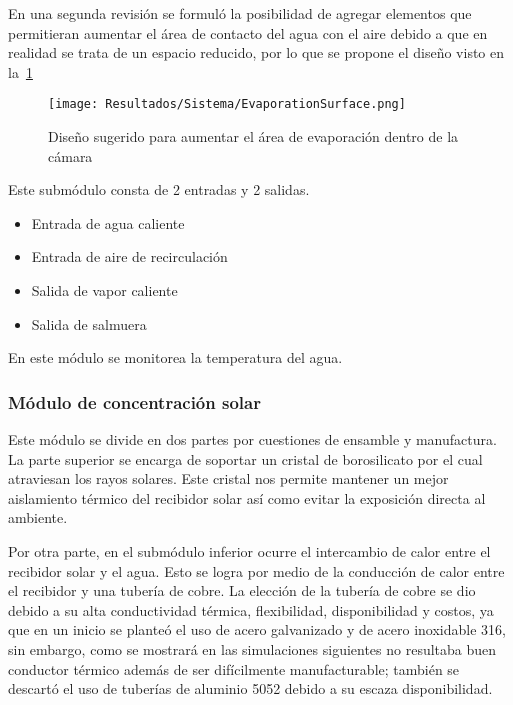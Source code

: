 				En una segunda revisión se formuló la posibilidad de agregar elementos que permitieran aumentar el área de contacto del agua con el aire debido a que en realidad se trata de un espacio reducido, por lo que se propone el diseño visto en la~\cref{fig:EvaporationSurface}
				
				\begin{figure}[H]
					\centering
					\texttt{[image: Resultados/Sistema/EvaporationSurface.png]}
					\caption{Diseño sugerido para aumentar el área de evaporación dentro de la cámara}
					\label{fig:EvaporationSurface}
				\end{figure}
				
				Este submódulo consta de 2 entradas y 2 salidas.
				
				\begin{itemize}[columns=2]
					\item Entrada de agua caliente
					\item Entrada de aire de recirculación
					\item Salida de vapor caliente
					\item Salida de salmuera
				\end{itemize}
				
				\begin{center}
					En este módulo se monitorea la temperatura del agua.
				\end{center}
			
			\subsubsection{Módulo de concentración solar}
				
				Este módulo se divide en dos partes por cuestiones de ensamble y manufactura. La parte superior se encarga de soportar un cristal de borosilicato por el cual atraviesan los rayos solares. Este cristal nos permite mantener un mejor aislamiento térmico del recibidor solar así como evitar la exposición directa al ambiente.
				
				Por otra parte, en el submódulo inferior ocurre el intercambio de calor entre el recibidor solar y el agua. Esto se logra por medio de la conducción de calor entre el recibidor y una tubería de cobre. La elección de la tubería de cobre se dio debido a su alta conductividad térmica, flexibilidad, disponibilidad y costos, ya que en un inicio se planteó el uso de acero galvanizado y de acero inoxidable 316, sin embargo, como se mostrará en las simulaciones siguientes no resultaba buen conductor térmico además de ser difícilmente manufacturable; también se descartó el uso de tuberías de aluminio 5052 debido a su escaza disponibilidad.
				
